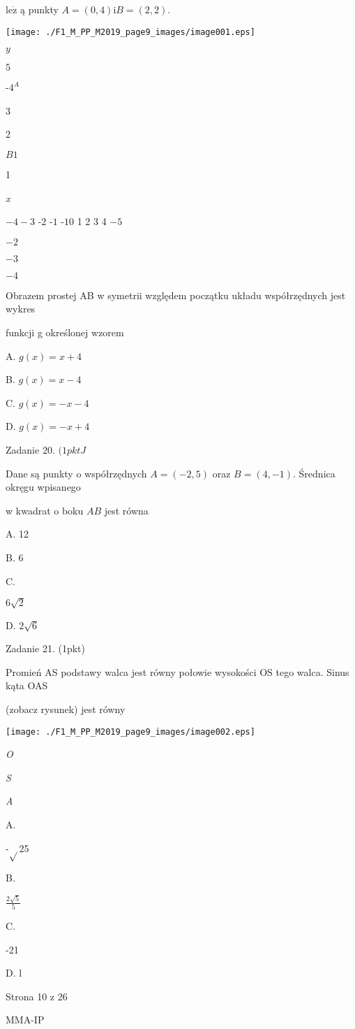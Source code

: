 \documentclass[a4paper,12pt]{article}
\begin{document}
$\mathrm{l}\mathrm{e}\dot{\mathrm{z}}$ ą punkty $A=(0,4)\mathrm{i}B=(2,2).$
\begin{center}
\texttt{[image: ./F1\_M\_PP\_M2019\_page9\_images/image001.eps]}
\end{center}
$y$

$5$

-$4^{A}$

3

2

$B1$

1

{\it x}

$-4  -3$ -$2$ -$1$ -$10$  1 2 3 4  $-5$

$-2$

$-3$

$-4$

Obrazem prostej AB w symetrii względem początku układu współrzędnych jest wykres

funkcji g określonej wzorem

A. $g(x)=x+4$

B. $g(x)=x-4$

C. $g(x)=-x-4$

D. $g(x)=-x+4$

Zadanie 20. $(1pktJ$

Dane są punkty o współrzędnych $A=(-2,5)$ oraz $B=(4,-1)$. Średnica okręgu wpisanego

w kwadrat o boku $AB$ jest równa

A. 12

B. 6

C.

$6\sqrt{2}$

D. $2\sqrt{6}$

Zadanie 21. (1pkt)

Promień AS podstawy walca jest równy połowie wysokości OS tego walca. Sinus kąta OAS

(zobacz rysunek) jest równy
\begin{center}
\texttt{[image: ./F1\_M\_PP\_M2019\_page9\_images/image002.eps]}
\end{center}
{\it O}

{\it S}

{\it A}

A.

-$\sqrt{}$25

B.

$\displaystyle \frac{2\sqrt{5}}{5}$

C.

-21

D. l

Strona 10 z 26

MMA-IP
\end{document}
